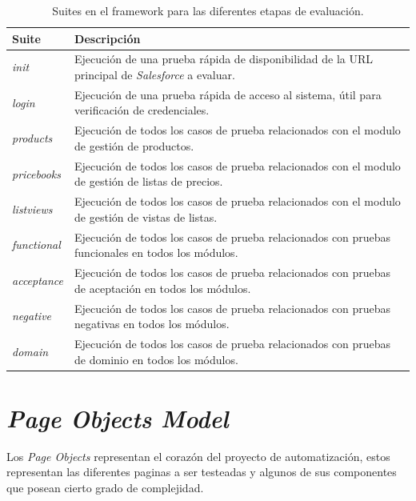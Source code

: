\begin{table}
\centering
\begin{tabular}{|l|p{12.0cm}|}
\hline
\footnotesize{\textbf{Suite}} & \footnotesize{\textbf{Descripción}} \\
\hline
\footnotesize{\emph{init}} & \footnotesize{Ejecución de una prueba rápida de
disponibilidad de la URL principal de \emph{Salesforce} a evaluar.} \\
\footnotesize{\emph{login}} & \footnotesize{Ejecución de una prueba rápida de
acceso al sistema, útil para verificación de credenciales.} \\
\footnotesize{\emph{products}} & \footnotesize{Ejecución de todos los casos de
prueba relacionados con el modulo de gestión  de productos.} \\
\footnotesize{\emph{pricebooks}} & \footnotesize{Ejecución de todos los casos de
prueba relacionados con el modulo de gestión de listas de precios.} \\
\footnotesize{\emph{listviews}} & \footnotesize{Ejecución de todos los casos de
prueba relacionados con el modulo de gestión de vistas de listas.} \\
\footnotesize{\emph{functional}} & \footnotesize{Ejecución de todos los casos de
prueba relacionados con pruebas funcionales en todos los módulos.} \\
\footnotesize{\emph{acceptance}} & \footnotesize{Ejecución de todos los casos de
prueba relacionados con pruebas de aceptación en todos los módulos.} \\
\footnotesize{\emph{negative}} & \footnotesize{Ejecución de todos los casos de
prueba relacionados con pruebas negativas en todos los módulos.} \\
\footnotesize{\emph{domain}} & \footnotesize{Ejecución de todos los casos de
prueba relacionados con pruebas de dominio en todos los módulos.} \\
\hline
\end{tabular}
\caption{Suites en el framework para las diferentes etapas de evaluación.}
\label{suites}
\end{table}

\section{\emph{Page Objects Model}}
Los \emph{Page Objects} representan el corazón del proyecto de automatización,
estos representan las diferentes paginas a ser testeadas y algunos de sus
componentes que posean cierto grado de complejidad.

